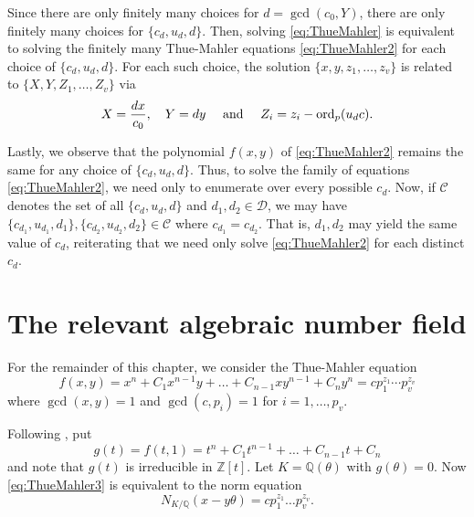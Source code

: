 Since there are only finitely many choices for $d = \gcd(c_0, Y)$, there are only finitely many choices for $\{c_d,u_d,d\}$. Then, solving \eqref{eq:ThueMahler} is equivalent to solving the finitely many Thue-Mahler equations \eqref{eq:ThueMahler2} for each choice of $\{c_d,u_d,d\}$.  For each such choice, the solution $\{x,y,z_1, \dots, z_v\}$ is related to $\{X,Y, Z_1, \dots, Z_v\}$ via
\[X = \frac{dx}{c_0},\quad Y=dy \quad \text{ and } \quad Z_i = z_i - \operatorname{ord}_p(u_dc).\]

Lastly, we observe that the polynomial $f(x,y)$ of \eqref{eq:ThueMahler2} remains the same for any choice of $\{c_d,u_d,d\}$. Thus, to solve the family of equations \eqref{eq:ThueMahler2}, we need only to enumerate over every possible $c_d$. Now, if $\mathcal{C}$ denotes the set of all $\{c_d,u_d,d\}$ and $d_1, d_2 \in \mathcal{D}$, we may have $\{c_{d_1},u_{d_1}, d_1\}, \{c_{d_2},u_{d_2}, d_2\} \in \mathcal{C}$ where $c_{d_1} = c_{d_2}$. That is, $d_1, d_2$ may yield the same value of $c_d$, reiterating that we need only solve \eqref{eq:ThueMahler2} for each distinct $c_d$. 


\section{The relevant algebraic number field}
\label{sec:RelevantAlgNumField}

For the remainder of this chapter, we consider the Thue-Mahler equation
\begin{equation} \label{eq:ThueMahler3}
f(x,y) = x^n + C_1 x^{n-1}y + \dots + C_{n-1}xy^{n-1} + C_ny^n = c p_1^{z_1} \cdots p_v^{z_v}
\end{equation}
where $\gcd(x,y) = 1$ and $\gcd(c,p_i) = 1$ for $i = 1, \dots, p_v$.

Following , put
\[g(t) = f(t,1) = t^n + C_1 t^{n-1} + \dots + C_{n-1}t + C_n\]
and note that $g(t)$ is irreducible in $\mathbb{Z}[t]$. Let $K = \mathbb{Q}(\theta)$ with $g(\theta) = 0$. Now \eqref{eq:ThueMahler3} is equivalent to the norm equation
\begin{equation} \label{eq:normTM}
N_{K/\mathbb{Q}}(x-y\theta) = cp_1^{z_1}\dots p_v^{z_v}.
\end{equation}

